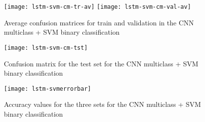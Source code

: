 	
	\begin{figure}[t]
		\centering
		\captionsetup{justification=centering}
		\texttt{[image: lstm-svm-cm-tr-av]}%
		\texttt{[image: lstm-svm-cm-val-av]}	
		\caption{Average confusion matrices for train and validation in the CNN multiclass + SVM binary classification}
		\label{fig:mesh36}
	\end{figure}
	
	\begin{figure}[t]
		\centering
		\captionsetup{justification=centering}
		\texttt{[image: lstm-svm-cm-tst]}
		\caption{Confusion matrix for the test set for the CNN multiclass + SVM binary classification}
		\label{fig:mesh37}
	\end{figure}
	
	\begin{figure}[t]
		\centering
		\captionsetup{justification=centering}
		\texttt{[image: lstm-svmerrorbar]}
		\caption{Accuracy values for the three sets for the CNN multiclass + SVM binary classification}
		\label{fig:mesh38}
	\end{figure}
	
	